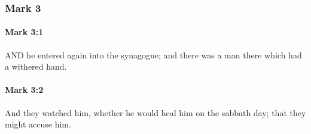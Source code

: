 	\subsubsection{Mark 3} %
		\label{MARK-3}
		
		\paragraph{Mark 3:1} %
			\label{MARK-3-1}

			AND he entered again into the synagogue; and there was a man there which had a withered hand.

			\begin{framed}
			\scriptsize
				\begin{compactdesc}
					\item[SBLG] 
				\end{compactdesc}
			\end{framed}

		\paragraph{Mark 3:2} %
			\label{MARK-3-2}

			And they watched him, whether he would heal him on the sabbath day; that they might accuse him.

